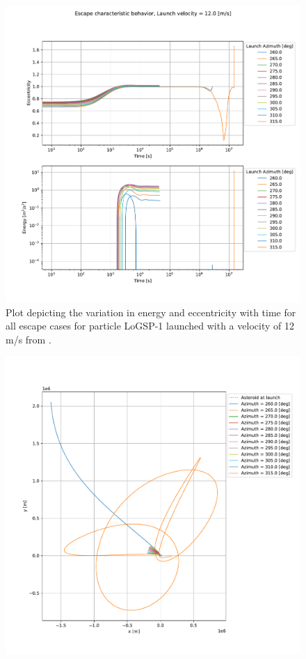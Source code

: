 \documentclass[print]{tudelft-report}
\begin{document}
\begin{appendices}
\begin{figure}[htb]
    \includegraphics[width=\textwidth, height=0.6\textheight, keepaspectratio=true]{Results/Images/leading_edge_perturbations/logsp1_escape_energy_ecc_12ms_solarPhase225.pdf}
    \caption{Plot depicting the variation in energy and eccentricity with time for all escape cases for particle LoGSP-1 launched with a velocity of 12 m/s from \protect{}.}
    \label{fig:leadingEdge_logsp1_escape_energy_ecc_12ms_solar225}
    \end{figure}
    \FloatBarrier
    \begin{figure}[htb]
    \centering
    \captionsetup{justification=centering}
    \includegraphics[width=\textwidth, height=0.6\textheight, keepaspectratio=true]{Results/Images/leading_edge_perturbations/logsp1_escape_traj_12ms_solarPhase225.pdf}

\end{figure}
\end{appendices}
\end{document}
